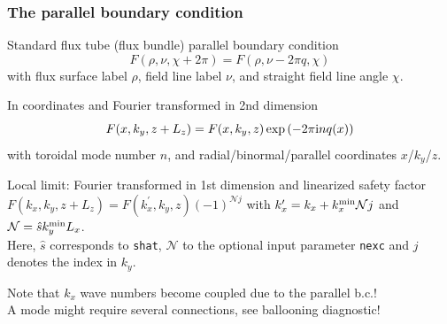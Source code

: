 \documentclass[10pt]{beamer}
\begin{document}
\begin{frame}
  \frametitle{The parallel boundary condition}

\begin{block}{Standard flux tube (flux bundle) parallel boundary condition}
$$F(\rho,\nu,\chi+2\pi) = F(\rho,\nu-2\pi q,\chi)$$
with flux surface label $\rho$, field line label $\nu$, and straight field line angle $\chi$.
\end{block}

\begin{block}{In \gene coordinates and Fourier transformed in 2nd dimension}
$$F(x,k_y,z+L_z) = F(x,k_y,z) \exp{\left(- 2\pi \text{i}n q(x)\right)}$$
with toroidal mode number $n$, and radial/binormal/parallel coordinates $x$/$k_y$/$z$.
\end{block}

\begin{block}{Local limit: Fourier transformed in 1st dimension and linearized safety factor}
$F(k_x,k_y,z+L_z) = F(k_x^\prime,k_y,z) (-1)^{\mathcal{N}j}$ with $k_x^\prime = k_x + k_x^{\rm min} \mathcal{N}j$ 
and $\mathcal{N} = \hat{s}k_y^{\rm min} L_x$. \\[1ex]
Here, $\hat{s}$ corresponds to {\tt shat}, $\mathcal{N}$ to the optional input parameter {\tt nexc} and $j$ 
denotes the index in $k_y$.
\end{block}

\begin{alertblock}{}
Note that $k_x$ wave numbers become coupled due to the parallel b.c.!\\
A mode might require several connections, see ballooning diagnostic! 
\end{alertblock}

\end{frame}

\end{document}
